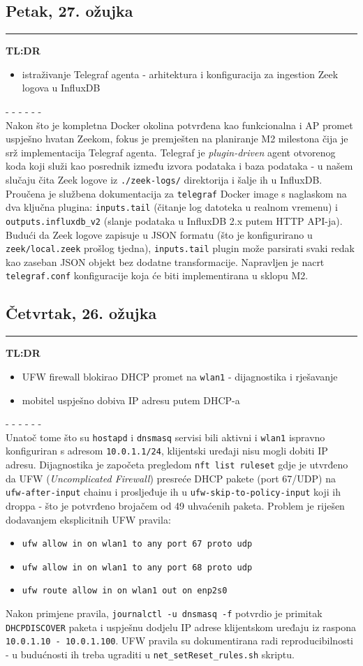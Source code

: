\documentclass[12pt, a4paper]{article}
\newcommand{\dan}[1]{
    \subsection*{#1}
    \vspace{-0.5em} 
    \hrule \vspace{0.5em} 
}
\begin{document}
\dan{Petak, 27. ožujka}
\textbf{TL:DR}
\begin{itemize}
    \item istraživanje Telegraf agenta - arhitektura i konfiguracija za ingestion Zeek logova u InfluxDB
\end{itemize}
- - - - - - \\
Nakon što je kompletna Docker okolina potvrđena kao funkcionalna i AP promet uspješno hvatan Zeekom,
fokus je premješten na planiranje M2 milestona čija je srž implementacija Telegraf agenta.
Telegraf je \textit{plugin-driven} agent otvorenog koda koji služi kao posrednik između izvora podataka
i baza podataka - u našem slučaju čita Zeek logove iz \lstinline|./zeek-logs/| direktorija i šalje
ih u InfluxDB.
Proučena je službena dokumentacija za \lstinline|telegraf| Docker image s naglaskom na dva ključna
plugina: \lstinline|inputs.tail| (čitanje log datoteka u realnom vremenu) i
\lstinline|outputs.influxdb_v2| (slanje podataka u InfluxDB 2.x putem HTTP API-ja).
Budući da Zeek logove zapisuje u JSON formatu (što je konfigurirano u \lstinline|zeek/local.zeek|
prošlog tjedna), \lstinline|inputs.tail| plugin može parsirati svaki redak kao zaseban JSON objekt
bez dodatne transformacije.
Napravljen je nacrt \lstinline|telegraf.conf| konfiguracije koja će biti implementirana u sklopu M2.
 
\dan{Četvrtak, 26. ožujka}
\textbf{TL:DR}
\begin{itemize}
    \item UFW firewall blokirao DHCP promet na \lstinline|wlan1| - dijagnostika i rješavanje
    \item mobitel uspješno dobiva IP adresu putem DHCP-a
\end{itemize}
- - - - - - \\
Unatoč tome što su \lstinline|hostapd| i \lstinline|dnsmasq| servisi bili aktivni i \lstinline|wlan1|
ispravno konfiguriran s adresom \lstinline|10.0.1.1/24|, klijentski uređaji nisu mogli dobiti IP adresu.
Dijagnostika je započeta pregledom \lstinline|nft list ruleset| gdje je utvrđeno da UFW (\textit{Uncomplicated Firewall})
presreće DHCP pakete (port 67/UDP) na \lstinline|ufw-after-input| chainu i prosljeđuje ih u
\lstinline|ufw-skip-to-policy-input| koji ih droppa - što je potvrđeno brojačem od 49 uhvaćenih paketa.
Problem je riješen dodavanjem eksplicitnih UFW pravila:
\begin{itemize}
    \item \lstinline|ufw allow in on wlan1 to any port 67 proto udp|
    \item \lstinline|ufw allow in on wlan1 to any port 68 proto udp|
    \item \lstinline|ufw route allow in on wlan1 out on enp2s0|
\end{itemize}
Nakon primjene pravila, \lstinline|journalctl -u dnsmasq -f| potvrdio je primitak
\lstinline|DHCPDISCOVER| paketa i uspješnu dodjelu IP adrese klijentskom uređaju iz raspona
\lstinline|10.0.1.10 - 10.0.1.100|.
UFW pravila su dokumentirana radi reproducibilnosti - u budućnosti ih treba ugraditi u
\lstinline|net_setReset_rules.sh| skriptu.
 
\end{document}

